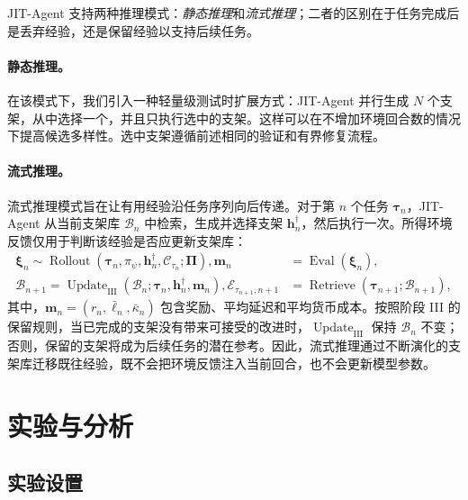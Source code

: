 \documentclass{article}
\newcommand{\ourmethod}{JIT-Agent\xspace}
\begin{document}
\ourmethod 支持两种推理模式：\textit{静态推理}和\textit{流式推理}；二者的区别在于任务完成后是丢弃经验，还是保留经验以支持后续任务。

\vspace{-0.7em}
\paragraph{静态推理。}
在该模式下，我们引入一种轻量级测试时扩展方式：\ourmethod 并行生成 $N$ 个支架，从中选择一个，并且只执行选中的支架。这样可以在不增加环境回合数的情况下提高候选多样性。选中支架遵循前述相同的验证和有界修复流程。

\vspace{-0.7em}
\paragraph{流式推理。}
流式推理模式旨在让有用经验沿任务序列向后传递。对于第 $n$ 个任务 $\boldsymbol{\tau}_n$，\ourmethod 从当前支架库 $\mathcal{B}_n$ 中检索，生成并选择支架 $\mathbf{h}^{\dagger}_n$，然后执行一次。所得环境反馈仅用于判断该经验是否应更新支架库：
\begin{equation}
\label{eq:streaming_inference}
\begin{aligned}
\boldsymbol{\xi}_{n}
\sim \operatorname{Rollout}(\boldsymbol{\tau}_n,\pi_{\psi},\mathbf{h}^{\dagger}_{n},\mathcal{C}_{\tau_n};\boldsymbol{\Pi}),
\mathbf{m}_{n}
&= \operatorname{Eval}(\boldsymbol{\xi}_{n}), \\
\mathcal{B}_{n+1}
= \operatorname{Update}_{\mathrm{III}}
(\mathcal{B}_{n};\boldsymbol{\tau}_n,\mathbf{h}^{\dagger}_{n},\mathbf{m}_{n}),
\mathcal{E}_{\tau_{n+1},n+1}
&= \operatorname{Retrieve}
(\boldsymbol{\tau}_{n+1};\mathcal{B}_{n+1}),
\end{aligned}
\end{equation}
其中，$\mathbf{m}_{n}=(r_n,\bar\ell_n,\bar\kappa_n)$ 包含奖励、平均延迟和平均货币成本。按照阶段 III 的保留规则，当已完成的支架没有带来可接受的改进时，$\operatorname{Update}_{\mathrm{III}}$ 保持 $\mathcal{B}_n$ 不变；否则，保留的支架将成为后续任务的潜在参考。因此，流式推理通过不断演化的支架库迁移既往经验，既不会把环境反馈注入当前回合，也不会更新模型参数。


\vspace{-0.5em}
\section{实验与分析}
\vspace{-0.5em}
\subsection{实验设置}
\vspace{-0.5em}
\end{document}
